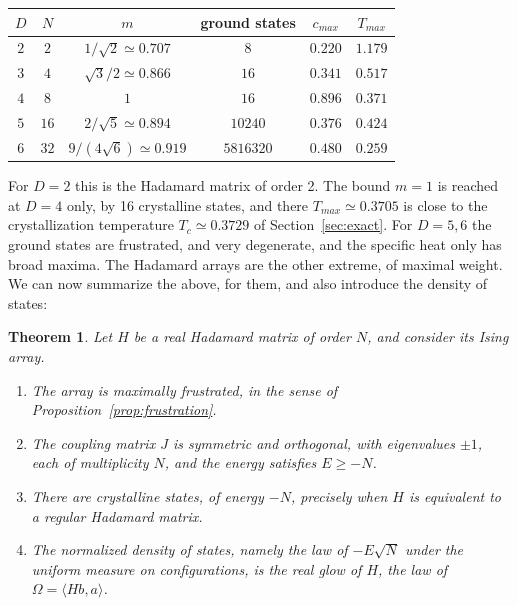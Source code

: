 \documentclass[11pt,a4paper]{article}
\newtheorem{thm}{Theorem}[section]
\theoremstyle{remark}
\begin{document}
\medskip

\begin{center}
\begin{tabular}{|c|c|c|c|c|c|}
\hline
$D$ & $N$ & $m$ & ground states & $c_{max}$ & $T_{max}$\\
\hline
$2$ & $2$ & $1/\sqrt2\simeq0.707$ & $8$ & $0.220$ & $1.179$\\
$3$ & $4$ & $\sqrt3/2\simeq0.866$ & $16$ & $0.341$ & $0.517$\\
$4$ & $8$ & $1$ & $16$ & $0.896$ & $0.371$\\
$5$ & $16$ & $2/\sqrt5\simeq0.894$ & $10240$ & $0.376$ & $0.424$\\
$6$ & $32$ & $9/(4\sqrt6)\simeq0.919$ & $5816320$ & $0.480$ & $0.259$\\
\hline
\end{tabular}
\end{center}

\medskip

For $D=2$ this is the Hadamard matrix of order 2. The bound $m=1$ is reached at $D=4$ only, by 16 crystalline states, and there $T_{max}\simeq0.3705$ is close to the crystallization temperature $T_c\simeq0.3729$ of Section~\ref{sec:exact}. For $D=5,6$ the ground states are frustrated, and very degenerate, and the specific heat only has broad maxima. The Hadamard arrays are the other extreme, of maximal weight. We can now summarize the above, for them, and also introduce the density of states:

\begin{samepage}
\begin{thm}\label{thm:model}
Let $H$ be a real Hadamard matrix of order $N$, and consider its Ising array.
\begin{enumerate}
\item The array is maximally frustrated, in the sense of Proposition~\ref{prop:frustration}.

\item The coupling matrix $J$ is symmetric and orthogonal, with eigenvalues $\pm1$, each of multiplicity $N$, and the energy satisfies $E\geq-N$.

\item There are crystalline states, of energy $-N$, precisely when $H$ is equivalent to a regular Hadamard matrix.

\item The normalized density of states, namely the law of $-E\sqrt N$ under the uniform measure on configurations, is the real glow of $H$, the law of $\Omega=\langle Hb,a\rangle$.
\end{enumerate}
\end{thm}
\end{samepage}
\end{document}
